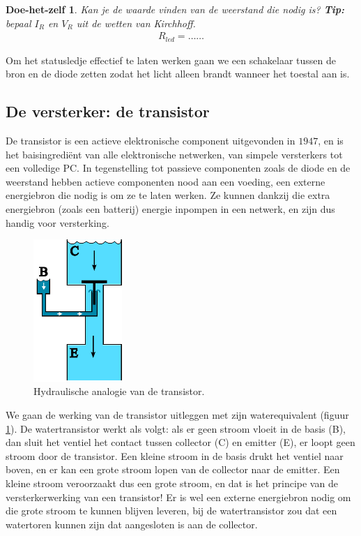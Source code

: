 \documentclass{article}
\newtheorem{DIY}{Doe-het-zelf}
\begin{document}
			\begin{DIY} Kan je de waarde vinden van de weerstand die nodig is? \textbf{Tip:} bepaal $I_R$ en $V_R$ uit de wetten van Kirchhoff.
			\begin{align*}
			    R_{led} = \ldots\ldots
			\end{align*}
			\end{DIY}

			Om het statusledje effectief te laten werken gaan we een schakelaar tussen de bron en de diode zetten zodat het licht alleen brandt wanneer het toestal aan is.

		\subsection{De versterker: de transistor}
			De transistor is een actieve elektronische component uitgevonden in $1947$, en is het baisingredi\"ent van alle elektronische netwerken, van simpele versterkers tot een volledige PC. In tegenstelling tot passieve componenten zoals de diode en de weerstand hebben actieve componenten nood aan een voeding, een externe energiebron die nodig is om ze te laten werken. Ze kunnen dankzij die extra energiebron (zoals een batterij) energie inpompen in een netwerk, en zijn dus handig voor versterking.

			\begin{figure}[htbp]
				\centering
				\includegraphics[width=0.3\textwidth]{watertransistor}
				\caption{Hydraulische analogie van de transistor.}
				\label{fig:watertransistor}
			\end{figure}

			We gaan de werking van de transistor uitleggen met zijn waterequivalent (figuur \ref{fig:watertransistor}). De watertransistor werkt als volgt: als er geen stroom vloeit in de basis (B), dan sluit het ventiel het contact tussen collector (C) en emitter (E), er loopt geen stroom door de transistor. Een kleine stroom in de basis drukt het ventiel naar boven, en er kan een grote stroom lopen van de collector naar de emitter. Een kleine stroom veroorzaakt dus een grote stroom, en dat is het principe van de versterkerwerking van een transistor! Er is wel een externe energiebron nodig om die grote stroom te kunnen blijven leveren, bij de watertransistor zou dat een watertoren kunnen zijn dat aangesloten is aan de collector.
\end{document}
